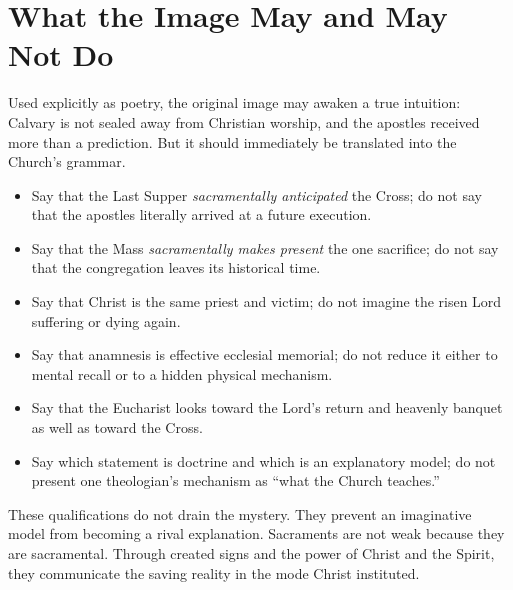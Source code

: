 \section{What the Image May and May Not Do}

Used explicitly as poetry, the original image may awaken a true intuition:
Calvary is not sealed away from Christian worship, and the apostles received
more than a prediction. But it should immediately be translated into the
Church's grammar.

\begin{itemize}
  \item Say that the Last Supper \emph{sacramentally anticipated} the Cross;
  do not say that the apostles literally arrived at a future execution.
  \item Say that the Mass \emph{sacramentally makes present} the one sacrifice;
  do not say that the congregation leaves its historical time.
  \item Say that Christ is the same priest and victim; do not imagine the
  risen Lord suffering or dying again.
  \item Say that anamnesis is effective ecclesial memorial; do not reduce it
  either to mental recall or to a hidden physical mechanism.
  \item Say that the Eucharist looks toward the Lord's return and heavenly
  banquet as well as toward the Cross.
  \item Say which statement is doctrine and which is an explanatory model;
  do not present one theologian's mechanism as ``what the Church teaches.''
\end{itemize}

These qualifications do not drain the mystery. They prevent an imaginative
model from becoming a rival explanation. Sacraments are not weak because they
are sacramental. Through created signs and the power of Christ and the Spirit,
they communicate the saving reality in the mode Christ instituted.

